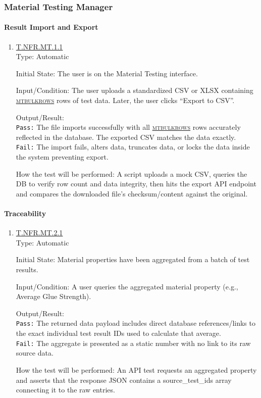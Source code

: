 \documentclass[12pt, titlepage]{article}
\newcommand{\testdef}[1]{\leavevmode\hypertarget{test:#1}{}\hyperlink{trace:#1}{#1}}
\DeclareRobustCommand{\cname}[1]{{\renewcommand{\_}{\textunderscore\allowbreak}\textsc{#1}}}
\newcommand{\constfirst}[1]{\leavevmode\hypertarget{constfirst:\detokenize{#1}}{}\hyperlink{const:\detokenize{#1}}{\cname{#1}}}
\newcommand{\const}[1]{\hyperlink{const:\detokenize{#1}}{\cname{#1}}}
\begin{document}
\subsubsection{Material Testing Manager}

\paragraph{Result Import and Export}
\begin{enumerate}
  \item \testdef{T.NFR.MT.1.1}\\
  Type: Automatic

  Initial State: The user is on the Material Testing interface.

  Input/Condition: The user uploads a standardized CSV or XLSX containing \constfirst{mt\_bulk\_rows} rows of test data. Later, the user clicks ``Export to CSV''.

  Output/Result: \\
  \texttt{Pass:} The file imports successfully with all \const{mt\_bulk\_rows} rows accurately reflected in the database. The exported CSV matches the data exactly.\\
  \texttt{Fail:} The import fails, alters data, truncates data, or locks the data inside the system preventing export.

  How the test will be performed: A script uploads a mock CSV, queries the DB to verify row count and data integrity, then hits the export API endpoint and compares the downloaded file's checksum/content against the original.
\end{enumerate}

\paragraph{Traceability}
\begin{enumerate}
  \item \testdef{T.NFR.MT.2.1}\\
  Type: Automatic

  Initial State: Material properties have been aggregated from a batch of test results.

  Input/Condition: A user queries the aggregated material property (e.g., Average Glue Strength).

  Output/Result: \\
  \texttt{Pass:} The returned data payload includes direct database references/links to the exact individual test result IDs used to calculate that average.\\
  \texttt{Fail:} The aggregate is presented as a static number with no link to its raw source data.

  How the test will be performed: An API test requests an aggregated property and asserts that the response JSON contains a source\_test\_ids array connecting it to the raw entries.
\end{enumerate}
\end{document}
